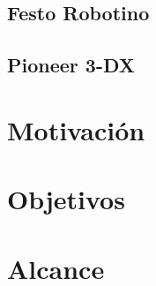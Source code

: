 \subsection{Festo Robotino}


\subsection{Pioneer 3-DX}

\section{Motivación}


\section{Objetivos}



\section{Alcance}

